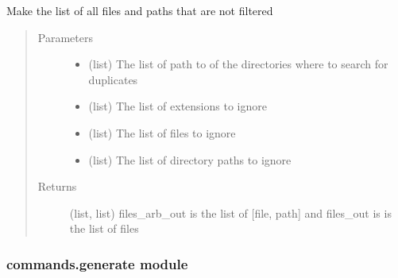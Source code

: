 \documentclass[a4paper,10pt,english]{sphinxmanual}
\begin{document}

\begin{fulllineitems}
\label{\detokenize{apidoc_commands/commands:commands.find_duplicates.list_directory}}
Make the list of all files and paths that are not filtered
\begin{quote}\begin{description}
\item[{Parameters}] \leavevmode\begin{itemize}
\item {} 
 \textendash{} (list) 
The list of path to of the directories where to  search for duplicates

\item {} 
 \textendash{} (list) The list of extensions to ignore

\item {} 
 \textendash{} (list) The list of files to ignore

\item {} 
 \textendash{} (list) 
The list of directory paths to ignore

\end{itemize}

\item[{Returns}] \leavevmode
(list, list) 
files\_arb\_out is the list of {[}file, path{]} 
and files\_out is is the list of files

\end{description}\end{quote}

\end{fulllineitems}



\subsubsection{commands.generate module}
\label{\detokenize{apidoc_commands/commands:module-commands.generate}}\label{\detokenize{apidoc_commands/commands:commands-generate-module}}
\end{document}
